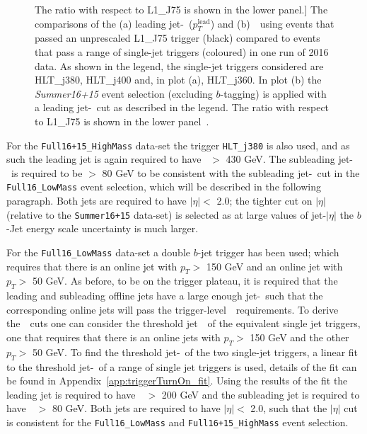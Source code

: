 \begin{figure}[!ht]
            The ratio with respect to L1\_J75 is shown in the lower panel.]
          {The comparisons of the (a) leading jet-\pT~($p_T^{\text{lead}}$) and (b)~\mjj~using events that passed an
            unprescaled L1\_J75 trigger (black) compared to events that pass a range of single-jet triggers (coloured) in one run of 2016 data.
            As shown in the legend, the single-jet triggers considered are HLT\_j380, HLT\_j400 and, in plot (a), HLT\_j360.
            In plot (b) the \textit{Summer16+15} event selection (excluding $b$-tagging) is applied with a leading jet-\pT~cut as described in the legend.
            The ratio with respect to L1\_J75 is shown in the lower panel~\cite{dibjet-ichep_conf}.}
     \label{fig:evt-ICHEP_turnon}
\end{figure}

For the \verb|Full16+15_HighMass| data-set the trigger \verb|HLT_j380| is also used,
and as such the leading jet is again required to have \pT~$>$ 430 GeV.
The subleading jet-\pT~is required to be $>$ 80 GeV to be consistent with the subleading jet-\pT~cut in the \verb|Full16_LowMass| event selection,
which will be described in the following paragraph.
Both jets  are required to have $|\eta| <$ 2.0;
the tighter cut on $|\eta|$ (relative to the \verb|Summer16+15| data-set) is selected
as at large values of jet-$|\eta|$ the $b$-Jet energy scale uncertainty is much larger.

For the \verb|Full16_LowMass| data-set a double $b$-jet trigger has been used;
which requires that there is an online jet with $p_T >$ 150 GeV and an online jet with $p_T >$ 50 GeV.
As before, to be on the trigger plateau, it is required that the leading and subleading offline jets
have a large enough jet-\pT~such that the corresponding online jets will pass the trigger-level~\pT~requirements.
To derive the~\pT~cuts one can consider the threshold jet~\pT~of the equivalent single jet triggers,
one that requires that there is an online jets with $p_T >$ 150 GeV and the other $p_T >$ 50 GeV.
To find the threshold jet-\pT~of the two single-jet triggers,
a linear fit to the threshold jet-\pT~of a range of single jet triggers is used,
details of the fit can be found in Appendix~\ref{app:triggerTurnOn_fit}.
Using the results of the fit the leading jet is required to have~\pT~$>$ 200 GeV
and the subleading jet is required to have~\pT~$>$ 80 GeV.
Both jets  are required to have $|\eta| <$ 2.0,
such that the $|\eta|$ cut is consistent for the \verb|Full16_LowMass| and \verb|Full16+15_HighMass| event selection.

